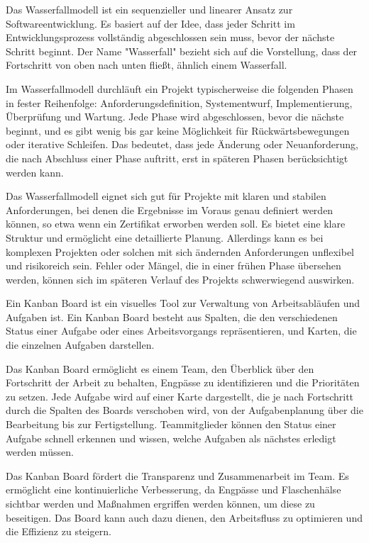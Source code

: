 Das Wasserfallmodell ist ein sequenzieller und linearer Ansatz zur Softwareentwicklung. Es basiert auf der Idee, dass jeder Schritt im Entwicklungsprozess vollständig abgeschlossen sein muss, bevor der nächste Schritt beginnt. Der Name "Wasserfall" bezieht sich auf die Vorstellung, dass der Fortschritt von oben nach unten fließt, ähnlich einem Wasserfall.

Im Wasserfallmodell durchläuft ein Projekt typischerweise die folgenden Phasen in fester Reihenfolge: Anforderungsdefinition, Systementwurf, Implementierung, Überprüfung und Wartung. Jede Phase wird abgeschlossen, bevor die nächste beginnt, und es gibt wenig bis gar keine Möglichkeit für Rückwärtsbewegungen oder iterative Schleifen. Das bedeutet, dass jede Änderung oder Neuanforderung, die nach Abschluss einer Phase auftritt, erst in späteren Phasen berücksichtigt werden kann.

Das Wasserfallmodell eignet sich gut für Projekte mit klaren und stabilen Anforderungen, bei denen die Ergebnisse im Voraus genau definiert werden können, so etwa wenn ein Zertifikat erworben werden soll.
Es bietet eine klare Struktur und ermöglicht eine detaillierte Planung. Allerdings kann es bei komplexen Projekten oder solchen mit sich ändernden Anforderungen unflexibel und risikoreich sein. Fehler oder Mängel, die in einer frühen Phase übersehen werden, können sich im späteren Verlauf des Projekts schwerwiegend auswirken.

Ein Kanban Board ist ein visuelles Tool zur Verwaltung von Arbeitsabläufen und Aufgaben ist. Ein Kanban Board besteht aus Spalten, die den verschiedenen Status einer Aufgabe oder eines Arbeitsvorgangs repräsentieren, und Karten, die die einzelnen Aufgaben darstellen.

Das Kanban Board ermöglicht es einem Team, den Überblick über den Fortschritt der Arbeit zu behalten, Engpässe zu identifizieren und die Prioritäten zu setzen. Jede Aufgabe wird auf einer Karte dargestellt, die je nach Fortschritt durch die Spalten des Boards verschoben wird, von der Aufgabenplanung über die Bearbeitung bis zur Fertigstellung. Teammitglieder können den Status einer Aufgabe schnell erkennen und wissen, welche Aufgaben als nächstes erledigt werden müssen.

Das Kanban Board fördert die Transparenz und Zusammenarbeit im Team. Es ermöglicht eine kontinuierliche Verbesserung, da Engpässe und Flaschenhälse sichtbar werden und Maßnahmen ergriffen werden können, um diese zu beseitigen. Das Board kann auch dazu dienen, den Arbeitsfluss zu optimieren und die Effizienz zu steigern.

